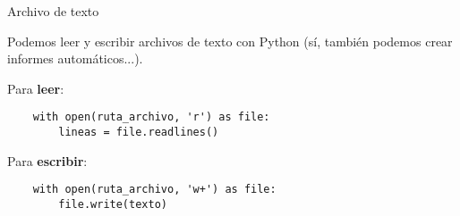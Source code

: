 \begin{frame}[fragile]{Archivo de texto}\vspace{10pt}

Podemos leer y escribir archivos de texto con Python (s\'i, tambi\'en podemos crear informes autom\'aticos...). 

\vspace{5pt}

Para \textbf{leer}:

\begin{center}
\begin{lstlisting}
	with open(ruta_archivo, 'r') as file:
		lineas = file.readlines()
\end{lstlisting}
\end{center}

\vspace{5pt}

Para \textbf{escribir}:

\begin{center}
\begin{lstlisting}
	with open(ruta_archivo, 'w+') as file:
		file.write(texto)
\end{lstlisting}
\end{center}


\end{frame}